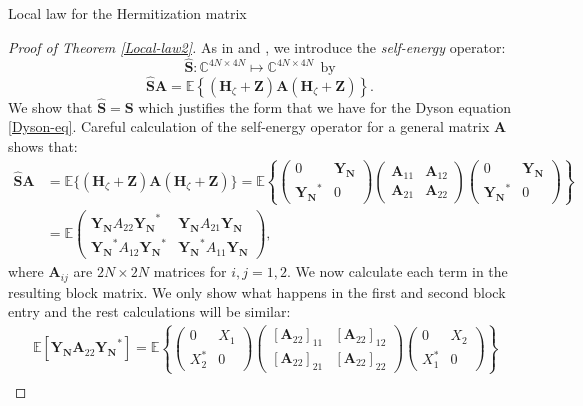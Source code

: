 \documentclass[11pt, a4paper, oneside]{book}
\numberwithin{equation}{chapter}
\newcommand{\E}{\mathbb E}
\newcommand{\beq}{\begin{equation}}
\newcommand{\eeq}{\end{equation}}
\begin{document}
\begin{section}{Local law for the Hermitization matrix}
\begin{proof}[Proof of Theorem \ref{Local-law2}]
As in \cite{alt2022local} and \cite{erdHos2019random}, we introduce the \textit{self-energy} operator:
%
$$ \bm{\hat{S}}: \mathbb{C}^{4N \times 4N} \mapsto \mathbb{C}^{4N \times 4N} \ \ \text{by} $$
%
\beq \label{self-energy} \bm{\hat{S}} \mathbf{A} = \E \left \{ ( \mathbf{H}_\zeta + \mathbf{Z} ) \mathbf{A} (\mathbf{H}_\zeta + \mathbf{Z} ) \right \} .\eeq
%
We show that $\bm{\hat{S}} = \bm{{S}} $ which justifies the form that we have for the Dyson equation \eqref{Dyson-eq}. Careful calculation of the self-energy operator for a general matrix $\mathbf{A}$ shows that:
%
\begin{align*}
\bm{\hat{S}} \mathbf{A} &= \E \{ ( \mathbf{H}_\zeta + \mathbf{Z} ) \mathbf{A} (\mathbf{H}_\zeta + \mathbf{Z} ) \} = \E \left \{ \begin{pmatrix} 0 & \mathbf{Y_N} \\ \mathbf{Y_N}^* & 0 \end{pmatrix} \begin{pmatrix} \mathbf{A}_{11} & \mathbf{A}_{12} \\ \mathbf{A}_{21} & \mathbf{A}_{22} \end{pmatrix} \begin{pmatrix} 0 & \mathbf{Y_N} \\ \mathbf{Y_N}^* & 0 \end{pmatrix} \right \}
\\
&= \E \begin{pmatrix}
\mathbf{Y_N} A_{22} \mathbf{Y_N}^* & \mathbf{Y_N} A_{21} \mathbf{Y_N} \\
\mathbf{Y_N}^* A_{12} \mathbf{Y_N}^* & \mathbf{Y_N}^* A_{11} \mathbf{Y_N}
\end{pmatrix},
\end{align*}
%
where $\mathbf{A}_{ij}$ are $2N \times 2N$ matrices for $i,j=1,2$. We now calculate each term in the resulting block matrix. We only show what happens in the first and second block entry and the rest calculations will be similar:
%
\begin{align*}
&\E [\mathbf{Y_N} \mathbf{A}_{22} \mathbf{Y_N}^*] = \E \left \{ \begin{pmatrix} 0 & X_1 \\ X_2^* & 0 \end{pmatrix} \begin{pmatrix} [\mathbf{A}_{22}]_{11} & [\mathbf{A}_{22}]_{12} \\ [\mathbf{A}_{22}]_{21} & [\mathbf{A}_{22}]_{22} \end{pmatrix} \begin{pmatrix} 0 & X_2 \\ X_1^* & 0 \end{pmatrix}\right \} \\

\end{align*}
\end{proof}
\end{section}
\end{document}

